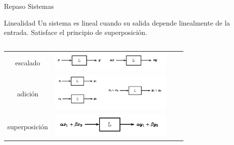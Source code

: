 \begin{frame}{Repaso Sistemas}
   \begin{block}{Linealidad}
      Un sistema es lineal cuando su salida depende linealmente de la entrada.
      Satisface el principio de superposición.
   \end{block}
   \begin{columns}[onlytextwidth]
      \begin{centering}
         \begin{table}[h]
            \begin{tabular}{cm{6cm}cm{6cm}}
               escalado      & \includegraphics[width=6cm]{1_clase/superposicion1}\\
               adición       & \includegraphics[width=6cm]{1_clase/superposicion2}\\
               superposición & \includegraphics[width=6cm]{1_clase/superposicion3}\\
            \end{tabular}
         \end{table}
      \end{centering}
   \end{columns}
   \vfill
\end{frame}
